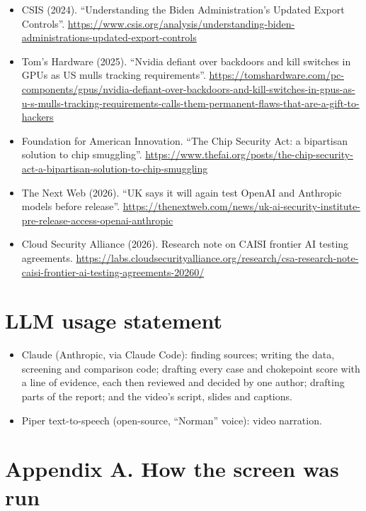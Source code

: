 \documentclass[11pt]{article}
\begin{document}
\begin{itemize}[leftmargin=1.5em, itemindent=-1.5em, label={}, itemsep=2pt]
\item CSIS (2024). ``Understanding the Biden Administration's Updated Export Controls''. \url{https://www.csis.org/analysis/understanding-biden-administrations-updated-export-controls}
\item Tom's Hardware (2025). ``Nvidia defiant over backdoors and kill switches in GPUs as US mulls tracking requirements''. \url{https://tomshardware.com/pc-components/gpus/nvidia-defiant-over-backdoors-and-kill-switches-in-gpus-as-u-s-mulls-tracking-requirements-calls-them-permanent-flaws-that-are-a-gift-to-hackers}
\item Foundation for American Innovation. ``The Chip Security Act: a bipartisan solution to chip smuggling''. \url{https://www.thefai.org/posts/the-chip-security-act-a-bipartisan-solution-to-chip-smuggling}
\item The Next Web (2026). ``UK says it will again test OpenAI and Anthropic models before release''. \url{https://thenextweb.com/news/uk-ai-security-institute-pre-release-access-openai-anthropic}
\item Cloud Security Alliance (2026). Research note on CAISI frontier AI testing agreements. \url{https://labs.cloudsecurityalliance.org/research/csa-research-note-caisi-frontier-ai-testing-agreements-20260/}
\end{itemize}
\endgroup

\section*{LLM usage statement}

\begin{itemize}[leftmargin=*]
\item Claude (Anthropic, via Claude Code): finding sources; writing the data, screening and comparison code; drafting every case and chokepoint score with a line of evidence, each then reviewed and decided by one author; drafting parts of the report; and the video's script, slides and captions.
\item Piper text-to-speech (open-source, ``Norman'' voice): video narration.
\end{itemize}

\section*{Appendix A. How the screen was run}
\end{document}
